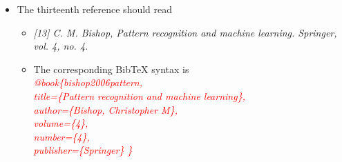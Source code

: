\documentclass[11pt]{article}
\begin{document}
\begin{itemize}
\begin{itemize}
    \item The thirteenth reference should read
    \begin{itemize}
        \item \textit{[13] C. M. Bishop, Pattern recognition and machine learning. Springer,
        vol. 4, no. 4. }
        \item The corresponding BibTeX syntax is \\
        \textcolor{red}{\textit{@book\{bishop2006pattern,\\
        title=\{Pattern recognition and machine learning\},\\
        author=\{Bishop, Christopher M\},\\
        volume=\{4\},\\
        number=\{4\},\\
        publisher=\{Springer\}
      \}}}
    \end{itemize}
\end{itemize}
\end{itemize}
\end{document}
